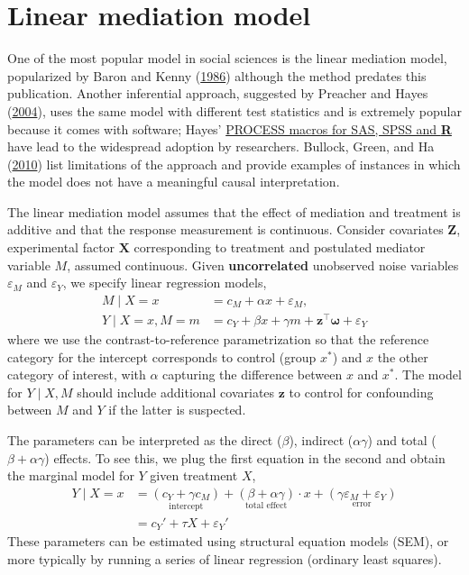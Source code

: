 \documentclass[
  11pt,
  letterpaper,
]{scrbook}
\theoremstyle{definition}
\theoremstyle{remark}
\begin{document}
\hypertarget{linear-mediation-model}{%
\section{Linear mediation model}\label{linear-mediation-model}}

One of the most popular model in social sciences is the linear mediation
model, popularized by Baron and Kenny
(\protect\hyperlink{ref-Baron.Kenny:1986}{1986}) although the method
predates this publication. Another inferential approach, suggested by
Preacher and Hayes (\protect\hyperlink{ref-Preacher.Hayes:2004}{2004}),
uses the same model with different test statistics and is extremely
popular because it comes with software; Hayes'
\href{https://www.processmacro.org/index.html}{PROCESS macros for SAS,
SPSS and \textbf{R}} have lead to the widespread adoption by
researchers. Bullock, Green, and Ha
(\protect\hyperlink{ref-Bullock.Green.Ha:2010}{2010}) list limitations
of the approach and provide examples of instances in which the model
does not have a meaningful causal interpretation.

The linear mediation model assumes that the effect of mediation and
treatment is additive and that the response measurement is continuous.
Consider covariates \(\mathbf{Z}\), experimental factor \(\mathbf{X}\)
corresponding to treatment and postulated mediator variable \(M\),
assumed continuous. Given \textbf{uncorrelated} unobserved noise
variables \(\varepsilon_M\) and \(\varepsilon_Y\), we specify linear
regression models, \begin{align*}
M \mid X=x &= c_M + \alpha x + \varepsilon_M,\\
Y \mid X=x, M=m &=  c_Y + \beta x + \gamma m + \mathbf{z}^\top\boldsymbol{\omega} + \varepsilon_Y
\end{align*} where we use the contrast-to-reference parametrization so
that the reference category for the intercept corresponds to control
(group \(x^*\)) and \(x\) the other category of interest, with
\(\alpha\) capturing the difference between \(x\) and \(x^*\). The model
for \(Y \mid X, M\) should include additional covariates \(\mathbf{z}\)
to control for confounding between \(M\) and \(Y\) if the latter is
suspected.

The parameters can be interpreted as the direct (\(\beta\)), indirect
(\(\alpha \gamma\)) and total (\(\beta + \alpha \gamma\)) effects. To
see this, we plug the first equation in the second and obtain the
marginal model for \(Y\) given treatment \(X\), \begin{align}
Y \mid X=x &= \underset{\text{intercept}}{(c_Y + \gamma c_M)} + \underset{\text{total effect}}{(\beta + \alpha\gamma)}\cdot x + \underset{\text{error}}{(\gamma \varepsilon_M + \varepsilon_Y)}\\
&= c_Y' + \tau X + \varepsilon_Y'
\end{align} These parameters can be estimated using structural equation
models (SEM), or more typically by running a series of linear regression
(ordinary least squares).
\end{document}
